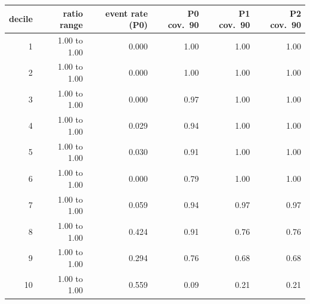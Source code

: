 \begin{tabular}{rrrrrr}
\toprule
decile & ratio range & event rate (P0) & P0 cov.\ 90 & P1 cov.\ 90 & P2 cov.\ 90 \\
\midrule
1 & 1.00 to 1.00 & 0.000 & 1.00 & 1.00 & 1.00 \\
2 & 1.00 to 1.00 & 0.000 & 1.00 & 1.00 & 1.00 \\
3 & 1.00 to 1.00 & 0.000 & 0.97 & 1.00 & 1.00 \\
4 & 1.00 to 1.00 & 0.029 & 0.94 & 1.00 & 1.00 \\
5 & 1.00 to 1.00 & 0.030 & 0.91 & 1.00 & 1.00 \\
6 & 1.00 to 1.00 & 0.000 & 0.79 & 1.00 & 1.00 \\
7 & 1.00 to 1.00 & 0.059 & 0.94 & 0.97 & 0.97 \\
8 & 1.00 to 1.00 & 0.424 & 0.91 & 0.76 & 0.76 \\
9 & 1.00 to 1.00 & 0.294 & 0.76 & 0.68 & 0.68 \\
10 & 1.00 to 1.00 & 0.559 & 0.09 & 0.21 & 0.21 \\
\bottomrule
\end{tabular}
